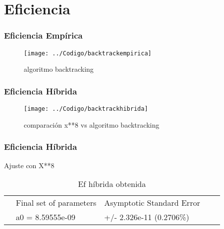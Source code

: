\documentclass{beamer}
\begin{document}
\section{Eficiencia}


\begin{frame}
	\frametitle{Eficiencia Empírica}	
	
	\begin{figure}[H]
		\centering
		\texttt{[image: ../Codigo/backtrackempirica]}
		\caption{algoritmo backtracking}
		\label{fig:backtrackhibrida}
	\end{figure}
	
	
	
\end{frame}







\begin{frame}
	\frametitle{Eficiencia Híbrida}	

		\begin{figure}[H]
\centering
\texttt{[image: ../Codigo/backtrackhibrida]}
\caption{comparación x**8 vs algoritmo backtracking}
\label{fig:backtrackhibrida}
\end{figure}


	
\end{frame}

\begin{frame}
	\frametitle{Eficiencia Híbrida}	
	Ajuste con X**8

	\begin{table}[]
		\centering
		\caption{Ef híbrida obtenida}
		\label{my-label}
		\begin{tabular}{lllll}
			& Final set of parameters &   Asymptotic Standard Error & \\
			& a0  = 8.59555e-09 &  +/- 2.326e-11    (0.2706\%)&  \\
		
		\end{tabular}
	\end{table}
	
	
	
\end{frame}
\end{document}
